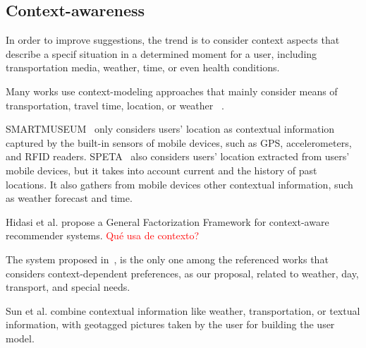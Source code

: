\subsection{Context-awareness}
In order to improve suggestions, the trend is to consider context aspects that describe a specif situation in a determined moment for a user, including transportation media, weather, time, or even health conditions. 

Many works use context-modeling approaches that mainly consider means of transportation, travel time,  location, or weather~\cite{rajaonarivo2019rec}\cite{bahramian_abbaspour_claramunt_2017}\cite{arigi2018context}\cite{kesorn2017personalized}\cite{logesh2019exploring} \cite{logesh2018personalised}.


SMARTMUSEUM~\cite{ruotsalo2013smartmuseum} only considers users' location as contextual information captured by the built-in sensors of mobile devices, such as GPS, accelerometers, and RFID readers. SPETA~\cite{garcia2009speta} also considers users' location extracted from users' mobile devices, but it takes into account current and the history of past locations. It also gathers from  mobile devices other contextual information, such as weather forecast and time.




Hidasi et al. \cite{hidasi2016general} propose a General Factorization Framework for context-aware recommender systems. \textcolor{red}{Qué usa de contexto?}





The system proposed in~\cite{alonso2012ontology}, is the only one among the referenced works that considers context-dependent   preferences, as our proposal,  related to weather, day, transport, and special needs.


Sun et al. \cite{sun2019building} combine contextual information like weather, transportation, or textual information, with geotagged pictures taken by the user for building the user model.



